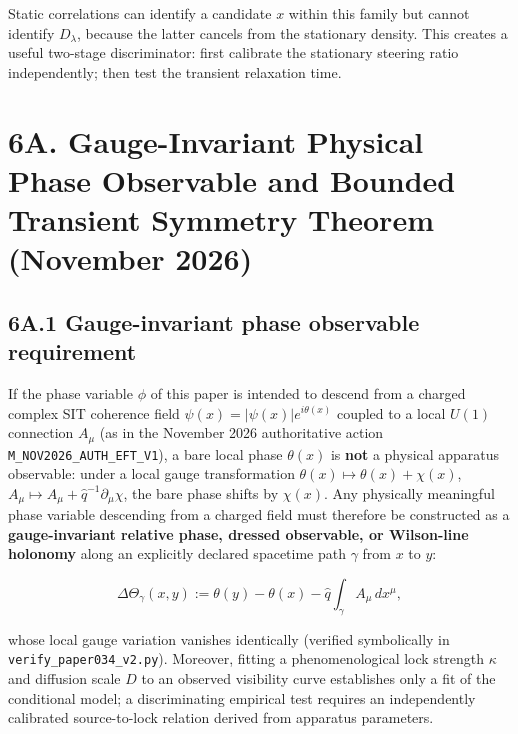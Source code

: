 \documentclass[
  american,
  11pt,
  letterpaper,
]{article}
\begin{document}
Static correlations can identify a candidate \(x\) within this family but cannot identify \(D_\lambda\), because the latter cancels from the stationary density. This creates a useful two-stage discriminator: first calibrate the stationary steering ratio independently; then test the transient relaxation time.

\section{6A. Gauge-Invariant Physical Phase Observable and Bounded Transient Symmetry Theorem (November 2026)}\label{a.-gauge-invariant-physical-phase-observable-and-bounded-transient-symmetry-theorem-november-2026}

\subsection{6A.1 Gauge-invariant phase observable requirement}\label{a.1-gauge-invariant-phase-observable-requirement}

If the phase variable \(\phi\) of this paper is intended to descend from a charged complex SIT coherence field \(\psi(x) = |\psi(x)| e^{i\theta(x)}\) coupled to a local \(U(1)\) connection \(A_\mu\) (as in the November 2026 authoritative action \nolinkurl{M_NOV2026_AUTH_EFT_V1}), a bare local phase \(\theta(x)\) is \textbf{not} a physical apparatus observable: under a local gauge transformation \(\theta(x) \mapsto \theta(x) + \chi(x)\), \(A_\mu \mapsto A_\mu + \hat{q}^{-1}\partial_\mu\chi\), the bare phase shifts by \(\chi(x)\). Any physically meaningful phase variable descending from a charged field must therefore be constructed as a \textbf{gauge-invariant relative phase, dressed observable, or Wilson-line holonomy} along an explicitly declared spacetime path \(\gamma\) from \(x\) to \(y\):

\begin{equation}
\Delta\Theta_\gamma(x, y) := \theta(y) - \theta(x) - \hat{q}\int_\gamma A_\mu\,dx^\mu,
\end{equation}

whose local gauge variation vanishes identically (verified symbolically in \nolinkurl{verify_paper034_v2.py}). Moreover, fitting a phenomenological lock strength \(\kappa\) and diffusion scale \(D\) to an observed visibility curve establishes only a fit of the conditional model; a discriminating empirical test requires an independently calibrated source-to-lock relation derived from apparatus parameters.
\end{document}
